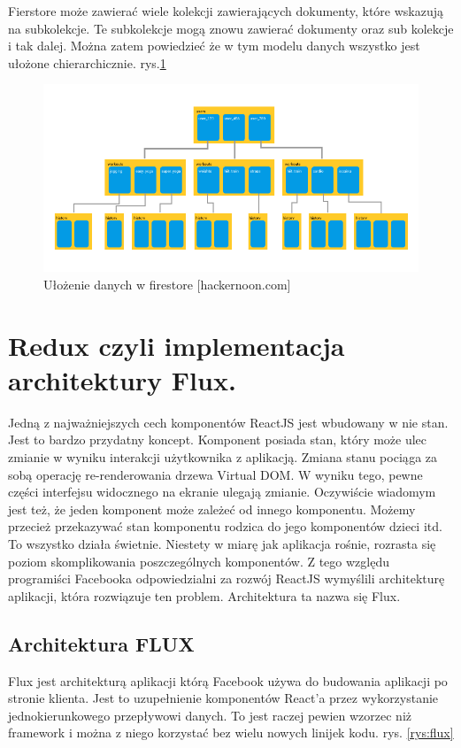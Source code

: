 Fierstore może zawierać wiele kolekcji zawierających dokumenty, które wskazują na subkolekcje. Te subkolekcje mogą znowu zawierać dokumenty oraz sub kolekcje i tak dalej.
Można zatem powiedzieć że w tym modelu danych wszystko jest ułożone chierarchicznie.\cite{www_hakermoon}
rys.\ref{rys:firestoreTree}

\begin{figure}
	\centering\includegraphics[width=.6\textwidth]{img/firestoreTree}
	\caption{Ułożenie danych w firestore [hackernoon.com]}\label{rys:firestoreTree}%
\end{figure}

\section{Redux czyli implementacja architektury Flux.}

Jedną z najważniejszych cech komponentów ReactJS jest wbudowany w nie stan. Jest to bardzo przydatny koncept. Komponent posiada stan, który może ulec zmianie w wyniku interakcji użytkownika z aplikacją. Zmiana stanu pociąga za sobą operację re-renderowania drzewa Virtual DOM. W wyniku tego, pewne części interfejsu widocznego na ekranie ulegają zmianie. Oczywiście wiadomym jest też, że jeden komponent może zależeć od innego komponentu. Możemy przecież przekazywać stan komponentu rodzica do jego komponentów dzieci itd.
To wszystko działa świetnie. Niestety w miarę jak aplikacja rośnie, rozrasta się poziom skomplikowania poszczególnych komponentów. Z tego względu programiści Facebooka odpowiedzialni za rozwój ReactJS wymyślili architekturę aplikacji, która rozwiązuje ten problem. Architektura ta nazwa się Flux.

\subsection{Architektura FLUX}

Flux jest architekturą aplikacji którą Facebook używa do budowania aplikacji po stronie klienta. Jest to uzupełnienie komponentów React’a przez wykorzystanie jednokierunkowego przepływowi danych. To jest raczej pewien wzorzec niż framework i można z niego korzystać  bez wielu nowych linijek kodu. rys. \ref{rys:flux}


